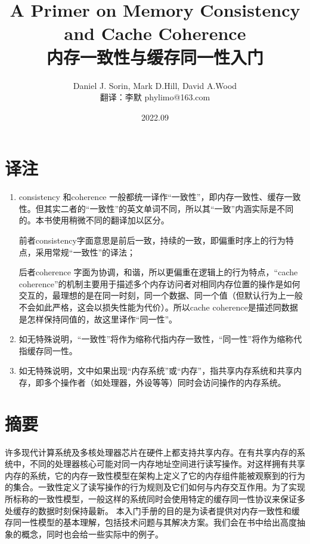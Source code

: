 \documentclass[UTF-8]{ctexrep}
\begin{document}
\title{\textbf{A Primer on Memory Consistency and Cache Coherence}\\内存一致性与缓存同一性入门}
\author{Daniel J. Sorin, Mark D.Hill, David A.Wood \\翻译：李默 phylimo@163.com}
\date{2022.09}
\maketitle
\chapter*{\textbf{译注}}

\begin{enumerate}
\item consistency 和coherence 一般都统一译作“一致性”，即内存一致性、缓存一致性。但其实二者的“一致性”的英文单词不同，所以其“一致”内涵实际是不同的。本书使用稍微不同的翻译加以区分。
\par 前者consistency字面意思是前后一致，持续的一致，即偏重时序上的行为特点，采用常规“一致性”的译法；
\par 后者coherence 字面为协调，和谐，所以更偏重在逻辑上的行为特点，“cache coherence”的机制主要用于描述多个内存访问者对相同内存位置的操作是如何交互的，最理想的是在同一时刻，同一个数据、同一个值（但默认行为上一般不会如此严格，这会以损失性能为代价）。所以cache coherence是描述同数据是怎样保持同值的，故这里译作“同一性”。
\item 如无特殊说明，“一致性”将作为缩称代指内存一致性，“同一性”将作为缩称代指缓存同一性。
\item 如无特殊说明，文中如果出现“内存系统”或“内存”，指共享内存系统和共享内存，即多个操作者（如处理器，外设等等）同时会访问操作的内存系统。
\end{enumerate}

\tableofcontents
\chapter*{摘要}
许多现代计算系统及多核处理器芯片在硬件上都支持共享内存。在有共享内存的系统中，不同的处理器核心可能对同一内存地址空间进行读写操作。对这样拥有共享内存的系统，它的内存一致性模型在架构上定义了它的内存组件能被观察到的行为的集合。一致性定义了读写操作的行为规则及它们如何与内存交互作用。为了实现所标称的一致性模型，一般这样的系统同时会使用特定的缓存同一性协议来保证多处缓存的数据时刻保持最新。 本入门手册的目的是为读者提供对内存一致性和缓存同一性模型的基本理解，包括技术问题与其解决方案。我们会在书中给出高度抽象的概念，同时也会给一些实际中的例子。
\end{document}
